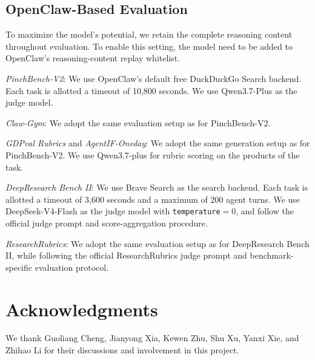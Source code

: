 \subsection{OpenClaw-Based Evaluation}


To maximize the model's potential, we retain the complete reasoning content throughout evaluation. To enable this setting, the model need to be added to OpenClaw's reasoning-content replay whitelist.

\emph{PinchBench-V2}: We use OpenClaw's default free DuckDuckGo Search backend. Each task is allotted a timeout of 10,800 seconds. We use Qwen3.7-Plus as the judge model.

\emph{Claw-Gym}: We adopt the same evaluation setup as for PinchBench-V2.

\emph{GDPval Rubrics} and \emph{AgentIF-Oneday}: We adopt the same generation setup as for PinchBench-V2. We use Qwen3.7-plus for rubric scoring on the products of the task.


\emph{DeepResearch Bench II}: We use Brave Search as the search backend. Each task is allotted a timeout of 3,600 seconds and a maximum of 200 agent turns. We use DeepSeek-V4-Flash as the judge model with \texttt{temperature}$=0$, and follow the official judge prompt and score-aggregation procedure.

\emph{ResearchRubrics}: We adopt the same evaluation setup as for DeepResearch Bench II, while following the official ResearchRubrics judge prompt and benchmark-specific evaluation protocol.

\section{Acknowledgments}

We thank Guoliang Cheng, Jianyong Xia, Kewen Zhu, Shu Xu, Yanxi Xie, and Zhihao Li for their discussions and involvement in this project.
